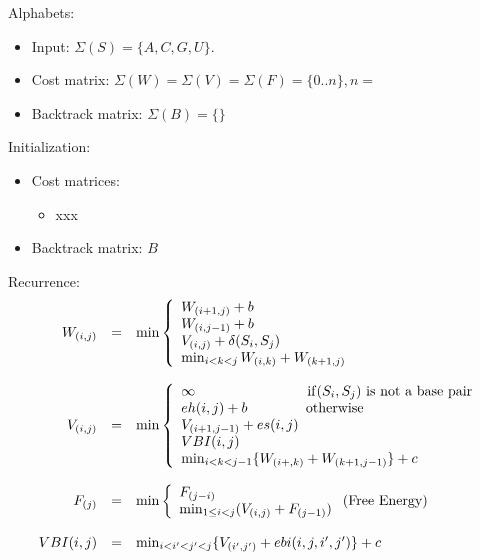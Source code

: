 \documentclass[11pt]{article}
\def\ul{\begin{itemize}}
\def\ule{\end{itemize}}
\begin{document}
Alphabets:\ul
\item Input: $\Sigma(S)=\{A,C,G,U\}$.
\item Cost matrix: $\Sigma(W)=\Sigma(V)=\Sigma(F)=\{0..n\},n=$
\item Backtrack matrix: $\Sigma(B)=\{\}$
\ule

Initialization:\ul
\item Cost matrices:\ul
	\item xxx
\ule
\item Backtrack matrix: $B$
\ule

Recurrence:
\[\begin{array}{rcl}
W_{(i,j)}&=&\min\left\{\begin{array}{l}
	W_{(i+1,j)}+b \\
	W_{(i,j-1)}+b \\
	V_{(i,j)}+\delta(S_i,S_j) \\
	\min_{i<k<j}W_{(i,k)}+W_{(k+1,j)}
\end{array}\right.\\\\
V_{(i,j)}&=&\min\left\{\begin{array}{ll}
	\infty \qquad\qquad\qquad\qquad {\rm if}(S_i,S_j) \text{ is not a base pair}\\
	eh(i,j)+b \qquad\qquad\, \text{otherwise} \\
	V_{(i+1,j-1)}+es(i,j) \\
	VBI(i,j) \\
	\min_{i<k<j-1}\{W_{(i+,k)}+W_{(k+1,j-1)}\} +c
\end{array}\right.\\\\
 F_{(j)}&=&\min\left\{\begin{array}{ll}
F_{(j-i)} \\
\min_{1\le i< j} (V_{(i,j)} + F_{(j-1)})
\end{array}\right. \text{(Free Energy)}\\\\
VBI(i,j)&=&\min_{i<i'<j'<j}\{V_{(i',j')}+ebi(i,j,i',j')\} +c
\end{array}\]
%
\end{document}
